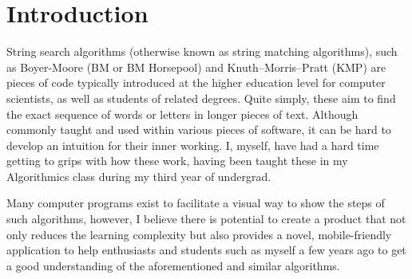 \documentclass{l4proj}
\begin{document}
%
%
%
%
%
%
%
%
\chapter{Introduction}



String search algorithms (otherwise known as string matching algorithms), such as Boyer-Moore (BM or BM Horsepool) and Knuth–Morris–Pratt (KMP) are pieces of code typically introduced at the higher education level for computer scientists, as well as students of related degrees. Quite simply, these aim to find the exact sequence of words or letters in longer pieces of text. Although commonly taught and used within various pieces of software, it can be hard to develop an intuition for their inner working. I, myself, have had a hard time getting to grips with how these work, having been taught these in my Algorithmics  class during my third year of undergrad.

Many computer programs exist to facilitate a visual way to show the steps of such algorithms, however, I believe there is potential to create a product that not only reduces the learning complexity but also provides a novel, mobile-friendly application to help enthusiasts and students such as myself a few years ago to get a good understanding of the aforementioned and similar algorithms.
\end{document}
